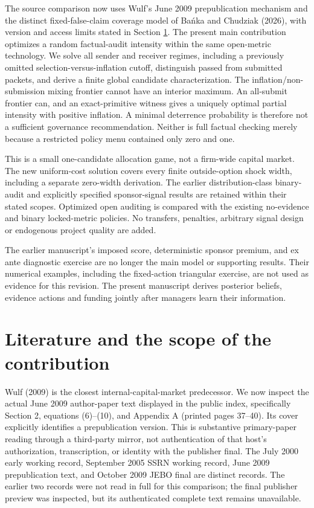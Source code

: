 \documentclass[11pt]{article}
\begin{document}
The source comparison now uses Wulf's June 2009 prepublication mechanism and the distinct fixed-false-claim coverage model of Ba\'nka and Chudziak (2026), with version and access limits stated in Section \ref{sec:literature}. The present main contribution optimizes a random factual-audit intensity within the same open-metric technology. We solve all sender and receiver regimes, including a previously omitted selection-versus-inflation cutoff, distinguish passed from submitted packets, and derive a finite global candidate characterization. The inflation/non-submission mixing frontier cannot have an interior maximum. An all-submit frontier can, and an exact-primitive witness gives a uniquely optimal partial intensity with positive inflation. A minimal deterrence probability is therefore not a sufficient governance recommendation. Neither is full factual checking merely because a restricted policy menu contained only zero and one.

This is a small one-candidate allocation game, not a firm-wide capital market. The new uniform-cost solution covers every finite outside-option shock width, including a separate zero-width derivation. The earlier distribution-class binary-audit and explicitly specified sponsor-signal results are retained within their stated scopes. Optimized open auditing is compared with the existing no-evidence and binary locked-metric policies. No transfers, penalties, arbitrary signal design or endogenous project quality are added.

The earlier manuscript's imposed score, deterministic sponsor premium, and ex ante diagnostic exercise are no longer the main model or supporting results. Their numerical examples, including the fixed-action triangular exercise, are not used as evidence for this revision. The present manuscript derives posterior beliefs, evidence actions and funding jointly after managers learn their information.

\section{Literature and the scope of the contribution}\label{sec:literature}
Wulf (2009) is the closest internal-capital-market predecessor. We now inspect the actual June 2009 author-paper text displayed in the public index, specifically Section 2, equations (6)--(10), and Appendix A (printed pages 37--40). Its cover explicitly identifies a prepublication version. This is substantive primary-paper reading through a third-party mirror, not authentication of that host's authorization, transcription, or identity with the publisher final. The July 2000 early working record, September 2005 SSRN working record, June 2009 prepublication text, and October 2009 JEBO final are distinct records. The earlier two records were not read in full for this comparison; the final publisher preview was inspected, but its authenticated complete text remains unavailable.
\end{document}
